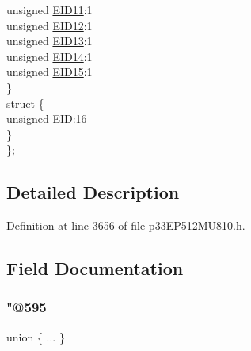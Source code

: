 \begin{DoxyCompactItemize}
\begin{tabbing}
\>\>unsigned \hyperlink{structtag_c1_r_x_m2_e_i_d_b_i_t_s_a710bdb0d602deb021b0be99066008018}{EID11}:1\\
\>\>unsigned \hyperlink{structtag_c1_r_x_m2_e_i_d_b_i_t_s_aa347bb85867bd8d4e0124f7cff8c6472}{EID12}:1\\
\>\>unsigned \hyperlink{structtag_c1_r_x_m2_e_i_d_b_i_t_s_a37d5f3edcbf6ef62f848fd4f3c584f79}{EID13}:1\\
\>\>unsigned \hyperlink{structtag_c1_r_x_m2_e_i_d_b_i_t_s_a7ffc0b0e0d99b8476b6f9a45337c17ab}{EID14}:1\\
\>\>unsigned \hyperlink{structtag_c1_r_x_m2_e_i_d_b_i_t_s_a293cd7dc1746257fa75a60cbd9383cd7}{EID15}:1\\
\>\} \\
\>struct \{\\
\>\>unsigned \hyperlink{structtag_c1_r_x_m2_e_i_d_b_i_t_s_ae80b378c9141f7c03e0b4e55b5f4b54d}{EID}:16\\
\>\} \\
\}; \\

\end{tabbing}\end{DoxyCompactItemize}


\subsection{Detailed Description}


Definition at line 3656 of file p33\+E\+P512\+M\+U810.\+h.



\subsection{Field Documentation}
\mbox{\label{structtag_c1_r_x_m2_e_i_d_b_i_t_s_aadcf57c3c4ef7b6be3ea8aa384fd122b}} 
\subsubsection{\texorpdfstring{"@595}{@595}}
{\footnotesize\ttfamily union \{ ... \} }

\mbox{\label{structtag_c1_r_x_m2_e_i_d_b_i_t_s_ae80b378c9141f7c03e0b4e55b5f4b54d}} 
